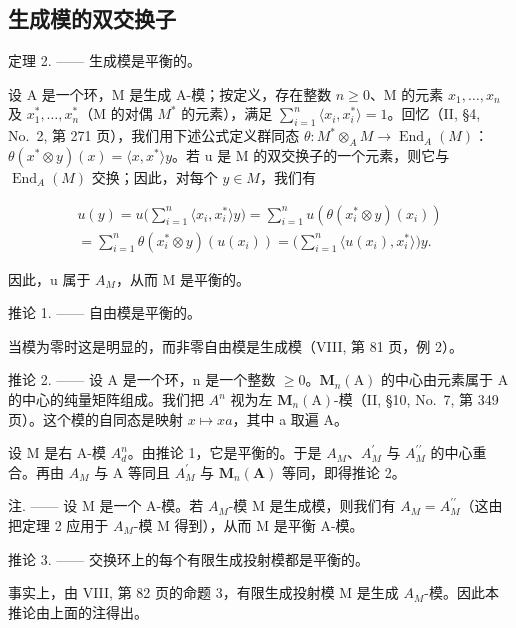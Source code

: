 \subsection{生成模的双交换子}

定理 2. —— 生成模是平衡的。

设 A 是一个环，M 是生成 A-模；按定义，存在整数 \(n \geqslant 0\)、M 的元素 \(x_{1}, \ldots, x_{n}\) 及 \(x_{1}^{*}, \ldots, x_{n}^{*}\)（M 的对偶 \(M^{*}\) 的元素），满足 \(\sum_{i=1}^{n} \langle x_{i}, x_{i}^{*} \rangle = 1\)。回忆（II, §4, No.~2, 第 271 页），我们用下述公式定义群同态 \(\theta : M^{*} \otimes_{A} M \to \operatorname{End}_{A}(M)\)：\(\theta(x^{*} \otimes y)(x) = \langle x, x^{*} \rangle y\)。若 u 是 M 的双交换子的一个元素，则它与 \(\operatorname{End}_{A}(M)\) 交换；因此，对每个 \(y \in M\)，我们有

\[
\begin{array}{l} u (y) = u \Big (\sum_ {i = 1} ^ {n} \langle x _ {i}, x _ {i} ^ {*} \rangle y \Big) = \sum_ {i = 1} ^ {n} u (\theta (x _ {i} ^ {*} \otimes y) (x _ {i})) \\ = \sum_ {i = 1} ^ {n} \theta (x _ {i} ^ {*} \otimes y) (u (x _ {i})) = \Big (\sum_ {i = 1} ^ {n} \langle u (x _ {i}), x _ {i} ^ {*} \rangle \Big) y. \end{array}
\]

因此，u 属于 \(A_{M}\)，从而 M 是平衡的。

推论 1. —— 自由模是平衡的。

当模为零时这是明显的，而非零自由模是生成模（VIII, 第 81 页，例 2）。

推论 2. —— 设 A 是一个环，n 是一个整数 \(\geqslant 0\)。\(\mathbf{M}_{n}(\mathrm{A})\) 的中心由元素属于 A 的中心的纯量矩阵组成。我们把 \(A^{n}\) 视为左 \(\mathbf{M}_{n}(\mathrm{A})\)-模（II, §10, No.~7, 第 349 页）。这个模的自同态是映射 \(x \mapsto xa\)，其中 a 取遍 A。

设 M 是右 A-模 \(A_{d}^{n}\)。由推论 1，它是平衡的。于是 \(A_{M}\)、\(A_{M}^{\prime}\) 与 \(A_{M}^{\prime\prime}\) 的中心重合。再由 \(A_{M}\) 与 A 等同且 \(A_{M}^{\prime}\) 与 \(\mathbf{M}_{n}(\mathbf{A})\) 等同，即得推论 2。

注. —— 设 M 是一个 A-模。若 \(A_{M}\)-模 M 是生成模，则我们有 \(A_{M} = A_{M}^{\prime\prime}\)（这由把定理 2 应用于 \(A_{M}\)-模 M 得到），从而 M 是平衡 A-模。

推论 3. —— 交换环上的每个有限生成投射模都是平衡的。

事实上，由 VIII, 第 82 页的命题 3，有限生成投射模 M 是生成 \(A_{M}\)-模。因此本推论由上面的注得出。

